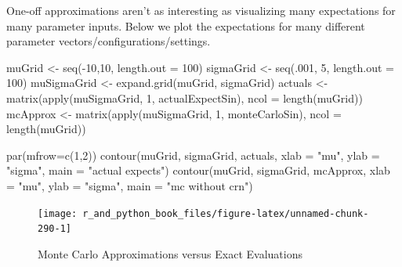 \documentclass[
  12pt,
  krantz2]{krantz}
\makeatletter
\newenvironment{Shaded}{\begin{snugshade}}{\end{snugshade}}
\newcommand{\AttributeTok}[1]{\textcolor[rgb]{0.61,0.61,0.61}{#1}}
\newcommand{\DecValTok}[1]{\textcolor[rgb]{0.06,0.06,0.06}{#1}}
\newcommand{\FunctionTok}[1]{\textcolor[rgb]{0,0,0}{#1}}
\newcommand{\NormalTok}[1]{#1}
\newcommand{\OtherTok}[1]{\textcolor[rgb]{0.37,0.37,0.37}{#1}}
\newcommand{\SpecialCharTok}[1]{\textcolor[rgb]{0,0,0}{#1}}
\newcommand{\StringTok}[1]{\textcolor[rgb]{0.5,0.5,0.5}{#1}}
\newenvironment{kframe}{%
\medskip{}
\setlength{\fboxsep}{.8em}
 \def\at@end@of@kframe{}%
 \ifinner\ifhmode%
  \def\at@end@of@kframe{\end{minipage}}%
  \begin{minipage}{\columnwidth}%
 \fi\fi%
 \def\FrameCommand##1{\hskip\@totalleftmargin \hskip-\fboxsep
 \colorbox{shadecolor}{##1}\hskip-\fboxsep
     \hskip-\linewidth \hskip-\@totalleftmargin \hskip\columnwidth}%
 \MakeFramed {\advance\hsize-\width
   \@totalleftmargin\z@ \linewidth\hsize
   \@setminipage}}%
 {\par\unskip\endMakeFramed%
 \at@end@of@kframe}
\renewenvironment{Shaded}{\begin{kframe}}{\end{kframe}}
\makeatother
\begin{document}
One-off approximations aren't as interesting as visualizing many expectations for many parameter inputs. Below we plot the expectations for many different parameter vectors/configurations/settings.

\begin{Shaded}
\begin{Highlighting}[]
\NormalTok{muGrid }\OtherTok{\textless{}{-}} \FunctionTok{seq}\NormalTok{(}\SpecialCharTok{{-}}\DecValTok{10}\NormalTok{,}\DecValTok{10}\NormalTok{, }\AttributeTok{length.out =} \DecValTok{100}\NormalTok{)}
\NormalTok{sigmaGrid }\OtherTok{\textless{}{-}} \FunctionTok{seq}\NormalTok{(.}\DecValTok{001}\NormalTok{, }\DecValTok{5}\NormalTok{, }\AttributeTok{length.out =} \DecValTok{100}\NormalTok{)}
\NormalTok{muSigmaGrid }\OtherTok{\textless{}{-}} \FunctionTok{expand.grid}\NormalTok{(muGrid, sigmaGrid)}
\NormalTok{actuals }\OtherTok{\textless{}{-}}  \FunctionTok{matrix}\NormalTok{(}\FunctionTok{apply}\NormalTok{(muSigmaGrid, }\DecValTok{1}\NormalTok{, actualExpectSin), }
                   \AttributeTok{ncol =} \FunctionTok{length}\NormalTok{(muGrid))}
\NormalTok{mcApprox }\OtherTok{\textless{}{-}} \FunctionTok{matrix}\NormalTok{(}\FunctionTok{apply}\NormalTok{(muSigmaGrid, }\DecValTok{1}\NormalTok{, monteCarloSin), }
                   \AttributeTok{ncol =} \FunctionTok{length}\NormalTok{(muGrid))}

\FunctionTok{par}\NormalTok{(}\AttributeTok{mfrow=}\FunctionTok{c}\NormalTok{(}\DecValTok{1}\NormalTok{,}\DecValTok{2}\NormalTok{))}
\FunctionTok{contour}\NormalTok{(muGrid, sigmaGrid, actuals, }
        \AttributeTok{xlab =} \StringTok{"mu"}\NormalTok{, }\AttributeTok{ylab =} \StringTok{"sigma"}\NormalTok{, }\AttributeTok{main =} \StringTok{"actual expects"}\NormalTok{)}
\FunctionTok{contour}\NormalTok{(muGrid, sigmaGrid, mcApprox, }
        \AttributeTok{xlab =} \StringTok{"mu"}\NormalTok{, }\AttributeTok{ylab =} \StringTok{"sigma"}\NormalTok{, }\AttributeTok{main =} \StringTok{"mc without crn"}\NormalTok{)}
\end{Highlighting}
\end{Shaded}

\begin{figure}

{\centering \texttt{[image: r\_and\_python\_book\_files/figure-latex/unnamed-chunk-290-1]} 

}

\caption{Monte Carlo Approximations versus Exact Evaluations}\label{fig:unnamed-chunk-290}
\end{figure}
\end{document}
